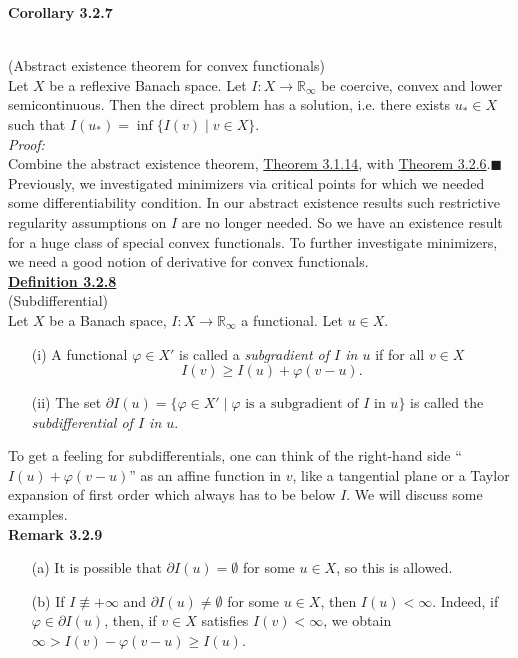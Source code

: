 \hypertarget{corollary_3_2_7}{\textbf{Corollary 3.2.7}}\\
(Abstract existence theorem for convex functionals)\\
Let $X$ be a reflexive Banach space. Let $I:X\longrightarrow\mathbb{R}_\infty$ be coercive, convex and lower semicontinuous. Then the direct problem has a solution, i.e. there exists $u_*\in X$ such that $I(u_*)=\inf\{I(v)\mid v\in X\}$.\\

\textit{Proof:}\\
Combine the abstract existence theorem, \hyperlink{theorem_3_1_14}{Theorem 3.1.14}, with \hyperlink{theorem_3_2_6}{Theorem 3.2.6}.\hfill$\blacksquare$\\[11pt]

Previously, we investigated minimizers via critical points for which we needed some differentiability condition. In our abstract existence results such restrictive regularity assumptions on $I$ are no longer needed. So we have an existence result for a huge class of special convex functionals. To further investigate minimizers, we need a good notion of derivative for convex functionals.\\

\textbf{\underline{Definition 3.2.8}}\\
(Subdifferential)\\
Let $X$ be a Banach space, $I:X\longrightarrow\mathbb{R}_\infty$ a functional. Let $u\in X$.
\begin{itemize}
	\item[(i)] A functional $\varphi\in X'$ is called a \textit{subgradient of $I$ in $u$} if for all $v\in X$
	\[I(v)\geq I(u)+\varphi(v-u).\]
	\item[(ii)] The set $\partial I(u)=\{\varphi\in X'\mid\varphi\text{ is a subgradient of }I\text{ in }u\}$ is called the \textit{subdifferential of $I$ in $u$}.\\
\end{itemize}

To get a feeling for subdifferentials, one can think of the right-hand side ``$I(u)+\varphi(v-u)$'' as an affine function in $v$, like a tangential plane or a Taylor expansion of first order which always has to be below $I$. We will discuss some examples.\\[11pt]

\hypertarget{remark_3_2_9}{\textbf{Remark 3.2.9}}
\begin{itemize}
	\item[(a)] It is possible that $\partial I(u)=\emptyset$ for some $u\in X$, so this is allowed.
	\item[(b)] If $I\not\equiv+\infty$ and $\partial I(u)\ne\emptyset$ for some $u\in X$, then $I(u)<\infty$. Indeed, if $\varphi\in\partial I(u)$, then, if $v\in X$ satisfies $I(v)<\infty$, we obtain $\infty>I(v)-\varphi(v-u)\geq I(u)$.\\[11pt]
\end{itemize}

